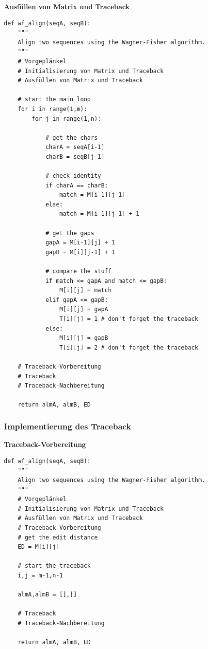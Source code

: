 \par\noindent\textbf{Ausfüllen von Matrix und Traceback}

\begin{verbatim}
def wf_align(seqA, seqB):
    """
    Align two sequences using the Wagner-Fisher algorithm.
    """
    # Vorgeplänkel
    # Initialisierung von Matrix und Traceback
    # Ausfüllen von Matrix und Traceback

    # start the main loop
    for i in range(1,m):
        for j in range(1,n):

            # get the chars
            charA = seqA[i-1]
            charB = seqB[j-1]

            # check identity
            if charA == charB:
                match = M[i-1][j-1]
            else:
                match = M[i-1][j-1] + 1

            # get the gaps
            gapA = M[i-1][j] + 1
            gapB = M[i][j-1] + 1

            # compare the stuff
            if match <= gapA and match <= gapB:
                M[i][j] = match
            elif gapA <= gapB:
                M[i][j] = gapA
                T[i][j] = 1 # don't forget the traceback
            else:
                M[i][j] = gapB
                T[i][j] = 2 # don't forget the traceback

    # Traceback-Vorbereitung
    # Traceback
    # Traceback-Nachbereitung

    return almA, almB, ED
\end{verbatim}



\subsubsection{\texorpdfstring{{Implementierung des
Traceback}}{Implementierung des Traceback}}

\par\noindent\textbf{Traceback-Vorbereitung}

\begin{verbatim}
def wf_align(seqA, seqB):
    """
    Align two sequences using the Wagner-Fisher algorithm.
    """
    # Vorgeplänkel
    # Initialisierung von Matrix und Traceback
    # Ausfüllen von Matrix und Traceback
    # Traceback-Vorbereitung
    # get the edit distance
    ED = M[i][j]

    # start the traceback
    i,j = m-1,n-1

    almA,almB = [],[]

    # Traceback
    # Traceback-Nachbereitung

    return almA, almB, ED
\end{verbatim}




